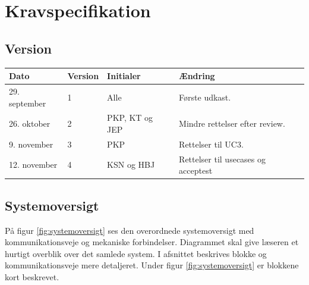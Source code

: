 \chapter{Kravspecifikation} \label{ch:kravspecifikation}
\section*{Version}
\begin{table}[h]
	\centering
	\begin{tabularx}{\textwidth - 2cm}{|l|l|l|X|}
	\hline
	Dato			& Version			& Initialer 		& Ændring										\\ \hline
	29. september 	& 1 				& Alle				& Første udkast. 								\\ \hline
	26. oktober		& 2 				& PKP, KT og JEP	& Mindre rettelser efter review.				\\ \hline
	9. november		& 3 				& PKP				& Rettelser til UC3. 							\\ \hline
	12. november	& 4 				& KSN og HBJ 		& Rettelser til usecases og acceptest			\\ \hline
	\end{tabularx}
\end{table}
\clearpage



\section{Systemoversigt} \label{sec:systemoversigt}
På figur \ref{fig:systemoversigt} ses den overordnede systemoversigt med kommunikationsveje og mekaniske forbindelser. Diagrammet skal give læseren et hurtigt overblik over det samlede system. I afsnittet %
beskrives blokke og kommunikationsveje mere detaljeret. Under figur \ref{fig:systemoversigt} er blokkene kort beskrevet. 

